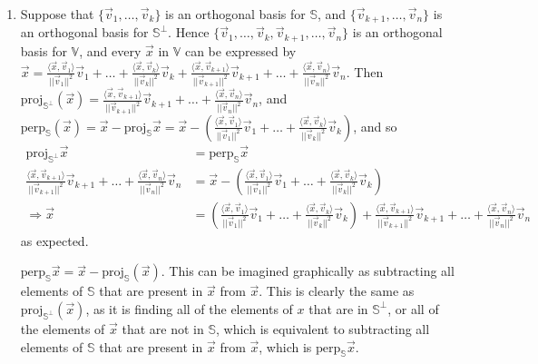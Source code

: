 \documentclass[10pt,english]{article}
\begin{document}
\begin{enumerate}
\pagebreak
\item Suppose that $\{\vec{v}_1,\ldots,\vec{v}_k\}$ is an orthogonal basis for $\mathbb{S}$, and $\{\vec{v}_{k+1},\ldots,\vec{v}_n\}$ is an orthogonal basis for $\mathbb{S}^\perp$. Hence $\{\vec{v}_1,\ldots,\vec{v}_k,\vec{v}_{k+1},\ldots,\vec{v}_n\}$ is an orthogonal basis for $\mathbb{V}$, and every $\vec{x}$ in $\mathbb{V}$ can be expressed by $\vec{x}=\frac{\langle\vec{x},\vec{v}_1\rangle}{||\vec{v}_1||^2}\vec{v}_1+\ldots+\frac{\langle\vec{x},\vec{v}_k\rangle}{||\vec{v}_k||^2}\vec{v}_k+\frac{\langle\vec{x},\vec{v}_{k+1}\rangle}{||\vec{v}_{k+1}||^2}\vec{v}_{k+1}+\ldots+\frac{\langle\vec{x},\vec{v}_n\rangle}{||\vec{v}_n||^2}\vec{v}_n$. Then $\text{proj}_{\mathbb{S}^\perp}(\vec{x})=\frac{\langle\vec{x},\vec{v}_{k+1}\rangle}{||\vec{v}_{k+1}||^2}\vec{v}_{k+1}+\ldots+\frac{\langle\vec{x},\vec{v}_n\rangle}{||\vec{v}_n||^2}\vec{v}_n$, and\\  $\text{perp}_\mathbb{S}(\vec{x})=\vec{x}-\text{proj}_\mathbb{S}\vec{x}=\vec{x}-\left(\frac{\langle\vec{x},\vec{v}_1\rangle}{||\vec{v}_1||^2}\vec{v}_1+\ldots+\frac{\langle\vec{x},\vec{v}_k\rangle}{||\vec{v}_k||^2}\vec{v}_k\right)$, and so \begin{align*}\text{proj}_{\mathbb{S}^\perp}\vec{x}&=\text{perp}_\mathbb{S}\vec{x}\\\frac{\langle\vec{x},\vec{v}_{k+1}\rangle}{||\vec{v}_{k+1}||^2}\vec{v}_{k+1}+\ldots+\frac{\langle\vec{x},\vec{v}_n\rangle}{||\vec{v}_n||^2}\vec{v}_n&=\vec{x}-\left(\frac{\langle\vec{x},\vec{v}_1\rangle}{||\vec{v}_1||^2}\vec{v}_1+\ldots+\frac{\langle\vec{x},\vec{v}_k\rangle}{||\vec{v}_k||^2}\vec{v}_k\right)\\\Rightarrow\vec{x}&=\left(\frac{\langle\vec{x},\vec{v}_1\rangle}{||\vec{v}_1||^2}\vec{v}_1+\ldots+\frac{\langle\vec{x},\vec{v}_k\rangle}{||\vec{v}_k||^2}\vec{v}_k\right)+\frac{\langle\vec{x},\vec{v}_{k+1}\rangle}{||\vec{v}_{k+1}||^2}\vec{v}_{k+1}+\ldots+\frac{\langle\vec{x},\vec{v}_n\rangle}{||\vec{v}_n||^2}\vec{v}_n\end{align*} as expected.

\pagebreak
$\text{perp}_\mathbb{S}\vec{x}=\vec{x}-\text{proj}_\mathbb{S}(\vec{x})$. This can be imagined graphically as subtracting all elements of $\mathbb{S}$ that are present in $\vec{x}$ from $\vec{x}$. This is clearly the same as $\text{proj}_{\mathbb{S}^\perp}(\vec{x})$, as it is finding all of the elements of $x$ that are in $\mathbb{S}^\perp$, or all of the elements of $\vec{x}$ that are not in $\mathbb{S}$, which is equivalent to subtracting all elements of $\mathbb{S}$ that are present in $\vec{x}$ from $\vec{x}$, which is $\text{perp}_\mathbb{S}\vec{x}$.


\end{enumerate}
\end{document}
